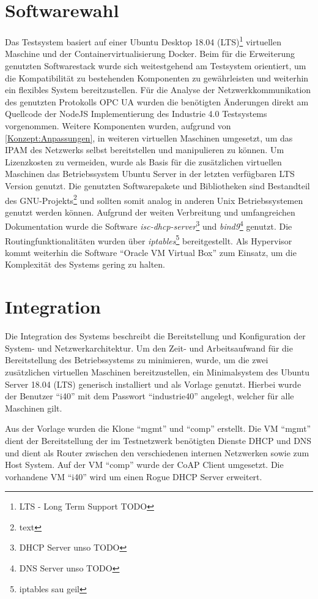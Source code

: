 \section{Softwarewahl}
Das Testsystem basiert auf einer Ubuntu Desktop 18.04 (\ac{LTS})\footnote{LTS - Long Term Support TODO} virtuellen Maschine und der Containervirtualisierung Docker. Beim für die Erweiterung genutzten Softwarestack wurde sich weitestgehend am Testsystem orientiert, um die Kompatibilität zu bestehenden Komponenten zu gewährleisten und weiterhin ein flexibles System bereitzustellen. Für die Analyse der Netzwerkkommunikation des genutzten Protokolls \ac{OPC UA} wurden die benötigten Änderungen direkt am Quellcode der NodeJS Implementierung des Industrie 4.0 Testsystems vorgenommen. Weitere Komponenten wurden, aufgrund von \autoref{Konzept:Anpassungen}, in weiteren virtuellen Maschinen umgesetzt, um das \ac{IPAM} des Netzwerks selbst bereitstellen und manipulieren zu können. Um Lizenzkosten zu vermeiden, wurde als Basis für die zusätzlichen virtuellen Maschinen das Betriebssystem Ubuntu Server in der letzten verfügbaren \ac{LTS} Version genutzt. Die genutzten Softwarepakete und Bibliotheken sind Bestandteil des GNU-Projekts\footnote{text} und sollten somit analog in anderen Unix Betriebssystemen genutzt werden können. Aufgrund der weiten Verbreitung und umfangreichen Dokumentation wurde die Software \textit{isc-dhcp-server}\footnote{DHCP Server unso TODO} und \textit{bind9}\footnote{DNS Server unso TODO} genutzt. Die Routingfunktionalitäten wurden über \textit{iptables}\footnote{iptables sau geil} bereitgestellt. Als Hypervisor kommt weiterhin die Software "`Oracle VM Virtual Box"' zum Einsatz, um die Komplexität des Systems gering zu halten.

\section{Integration}
Die Integration des Systems beschreibt die Bereitstellung und Konfiguration der System- und Netzwerkarchitektur. Um den Zeit- und Arbeitsaufwand für die Bereitstellung des Betriebssystems zu minimieren, wurde, um die zwei zusätzlichen virtuellen Maschinen bereitzustellen, ein Minimalsystem des Ubuntu Server 18.04 (\ac{LTS}) generisch installiert und als Vorlage genutzt. Hierbei wurde der Benutzer "`i40"' mit dem Passwort "`industrie40"' angelegt, welcher für alle Maschinen gilt.

Aus der Vorlage wurden die Klone "`mgmt"' und "`comp"' erstellt. Die \ac{VM} "`mgmt"' dient der Bereitstellung der im Testnetzwerk benötigten Dienste \ac{DHCP} und \ac{DNS} und dient als Router zwischen den verschiedenen internen Netzwerken sowie zum Host System. Auf der \ac{VM} "`comp"' wurde der \ac{CoAP} Client umgesetzt. Die vorhandene \ac{VM} "`i40"' wird um einen Rogue DHCP Server erweitert. 

